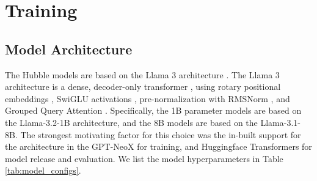 \newpage
\section{Training}
\label{app:training_details}

\subsection{Model Architecture}

The Hubble models are based on the Llama 3 architecture \citep{grattafiori2024llama3herdmodels}. The Llama 3 architecture is a dense, decoder-only transformer \citep{vaswani_transformers_2017}, using rotary positional embeddings \citep[RoPE][]{su_2024_roformer}, SwiGLU activations \citep{shazeer2020gluvariantsimprovetransformer}, pre-normalization with RMSNorm \citep{zhang_2019_layer}, and Grouped Query Attention \citep[GQA;][]{ainslie-etal-2023-gqa}. Specifically, the 1B parameter models are based on the Llama-3.2-1B architecture, and the 8B models are based on the Llama-3.1-8B. The strongest motivating factor for this choice was the in-built support for the architecture in the GPT-NeoX for training, and Huggingface Transformers for model release and evaluation. We list the model hyperparameters in Table \ref{tab:model_configs}.

